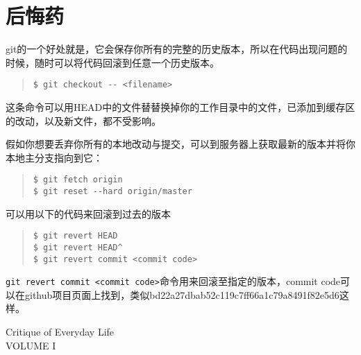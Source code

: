 \documentclass{article}
\begin{document}
	\section{后悔药} %
	\label{sec:后悔药}
		git的一个好处就是，它会保存你所有的完整的历史版本，所以在代码出现问题的时候，随时可以将代码回滚到任意一个历史版本。
		\begin{quote}
			\begin{lstlisting}
$ git checkout -- <filename>
			\end{lstlisting}
		\end{quote}
		这条命令可以用HEAD中的文件替替换掉你的工作目录中的文件，已添加到缓存区的改动，以及新文件，都不受影响。
		\par 假如你想要丢弃你所有的本地改动与提交，可以到服务器上获取最新的版本并将你本地主分支指向到它：
		\begin{quote}
			\begin{lstlisting}
$ git fetch origin
$ git reset --hard origin/master
			\end{lstlisting}
		\end{quote}
		可以用以下的代码来回滚到过去的版本
		\begin{quote}
			\begin{lstlisting}
$ git revert HEAD
$ git revert HEAD^
$ git revert commit <commit code>
			\end{lstlisting}
		\end{quote}
		{\tt git revert commit <commit code>}命令用来回滚至指定的版本，commit code可以在github项目页面上找到，类似bd22a27dbab52c119c7ff66a1c79a8491f82e5d6这样。

		Critique of Everyday Life\\
		VOLUME I
\end{document}
